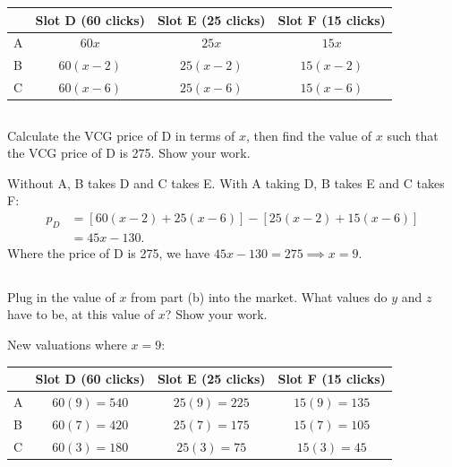 \documentclass[newpages]{assignment}
\begin{document}
\begin{center}
    \begin{tabular}{lccc}
        \toprule
          & Slot D (60 clicks) & Slot E (25 clicks) & Slot F (15 clicks) \\
        \midrule
        A & $60x$              & $25x$              & $15x$              \\
        B & $60(x-2)$          & $25(x-2)$          & $15(x-2)$          \\
        C & $60(x-6)$          & $25(x-6)$          & $15(x-6)$          \\
        \bottomrule
    \end{tabular}
\end{center}

\subsection{}
\begin{problem}
    Calculate the VCG price of D in terms of \(x\), then find the value of \(x\) such that the VCG price of D is 275. Show your work.
\end{problem}

Without A, B takes D and C takes E. With A taking D, B takes E and C takes F:
\[
    \begin{aligned}
        p_D
         & = \left[60(x-2)+25(x-6)\right]
        -\left[25(x-2)+15(x-6)\right]     \\
         & = 45x-130.
    \end{aligned}
\]
Where the price of D is 275, we have $45x-130=275 \implies x=9$.

\subsection{}
\begin{problem}
    Plug in the value of \(x\) from part (b) into the market. What values do \(y\) and \(z\) have to be, at this value of \(x\)? Show your work.
\end{problem}

New valuations where $x=9$:

\begin{center}
    \begin{tabular}{lccc}
        \toprule
          & Slot D (60 clicks)        & Slot E (25 clicks)        & Slot F (15 clicks)       \\
        \midrule
        A & \underline{$60(9) = 540$} & $25(9) = 225$             & $15(9) = 135$            \\
        B & $60(7) = 420$             & \underline{$25(7) = 175$} & $15(7) = 105$            \\
        C & $60(3) = 180$             & $25(3) = 75$              & \underline{$15(3) = 45$} \\
        \bottomrule
    \end{tabular}
\end{center}
\end{document}

